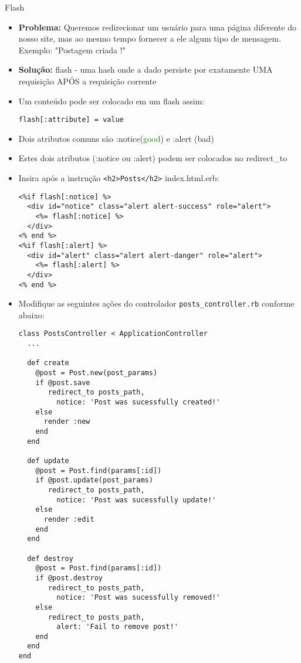 \begin{frame}{Flash}
	\begin{itemize}
		\item \textbf{\alert{Problema:}} Queremos \alert{redirecionar} um usuário para uma página 
			diferente do nosso site, mas ao mesmo tempo \alert{fornecer} a ele algum tipo de mensagem.
			Exemplo: "Postagem criada !" 
		\item \textbf{\alert{Solução:}} flash - uma \alert{hash} onde a dado persiste por exatamente 
			\alert{UMA requisição APÓS} a requisição corrente
		\item Um conteúdo pode ser colocado em um flash assim:
		\begin{lstlisting}[style=RubyInputStyle, caption=controllers/posts\_controller.rb] 
			flash[:attribute] = value
		\end{lstlisting}		
		\item Dois atributos \alert{comuns} são \alert{:notice}(\textcolor{Green}{good}) e \alert{:alert}
			(\alert{bad})
		\item Estes dois atributos (:notice ou :alert) podem ser colocados no redirect\_to
		\item Insira após a instrução \verb|<h2>Posts</h2>| \alert{index.html.erb}:
		\begin{lstlisting}[style=RubyInputStyle, caption=views/posts/index.html.erb]
<%if flash[:notice] %>
  <div id="notice" class="alert alert-success" role="alert">
    <%= flash[:notice] %>
  </div>
<% end %>
<%if flash[:alert] %>
  <div id="alert" class="alert alert-danger" role="alert">
    <%= flash[:alert] %>
  </div>
<% end %>				
		\end{lstlisting}
		\item Modifique as seguintes ações do controlador \verb|posts_controller.rb| conforme abaixo:
		\begin{lstlisting}[style=RubyInputStyle, caption=app/controllers/posts\_controller.rb]
class PostsController < ApplicationController
  ...
  
  def create
    @post = Post.new(post_params)
    if @post.save
       redirect_to posts_path, 
         notice: 'Post was sucessfully created!'
    else
      render :new 
    end 
  end

  def update
    @post = Post.find(params[:id])
    if @post.update(post_params)
       redirect_to posts_path, 
         notice: 'Post was sucessfully update!'
    else
      render :edit 
    end 
  end

  def destroy
    @post = Post.find(params[:id])
    if @post.destroy
       redirect_to posts_path, 
         notice: 'Post was sucessfully removed!'
    else
       redirect_to posts_path, 
         alert: 'Fail to remove post!'
    end 
  end
end		
  \end{lstlisting}
				
	\end{itemize}	
\end{frame}
